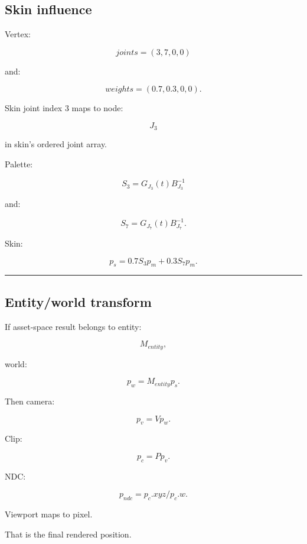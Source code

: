 \hypertarget{04-visual-computing-ii-ch041-section}{}

\subsection{Skin influence}\label{04-visual-computing-ii-ch041-skin-influence}

\hypertarget{04-visual-computing-ii-ch041-skin-influence}{}

Vertex:

\[
joints=
(3,7,0,0)
\]

and:

\[
weights=
(0.7,0.3,0,0).
\]

Skin joint index 3 maps to node:

\[
J_3
\]

in skin's ordered joint array.

Palette:

\[
S_3=
G_{J_3}(t)
B_{J_3}^{-1}
\]

and:

\[
S_7=
G_{J_7}(t)
B_{J_7}^{-1}.
\]

Skin:

\[
\boxed{
p_s
=
0.7S_3p_m
+
0.3S_7p_m.
}
\]

\begin{center}\rule{0.5\linewidth}{0.5pt}\end{center}

\subsection{Entity/world transform}\label{04-visual-computing-ii-ch041-entityworld-transform}

\hypertarget{04-visual-computing-ii-ch041-entityworld-transform}{}

If asset-space result belongs to entity:

\[
M_{entity},
\]

world:

\[
\boxed{
p_w=
M_{entity}p_s.
}
\]

Then camera:

\[
p_v=
Vp_w.
\]

Clip:

\[
\boxed{
p_c=
Pp_v.
}
\]

NDC:

\[
p_{ndc}
=
p_c.xyz/p_c.w.
\]

Viewport maps to pixel.

That is the final rendered position.

